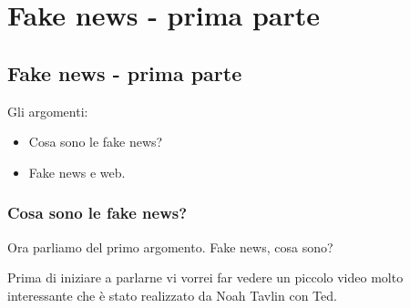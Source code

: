 \chapter{Fake news - prima parte}

\section{Fake news - prima parte}

Gli argomenti:
\begin{itemize}
    \item Cosa sono le fake news?
    \item Fake news e web.
\end{itemize}

\subsection{Cosa sono le fake news?}
Ora parliamo del primo argomento. Fake news, cosa sono?\par
Prima di iniziare a parlarne vi vorrei far vedere un piccolo video molto interessante che è stato realizzato da Noah Tavlin con Ted.
 
